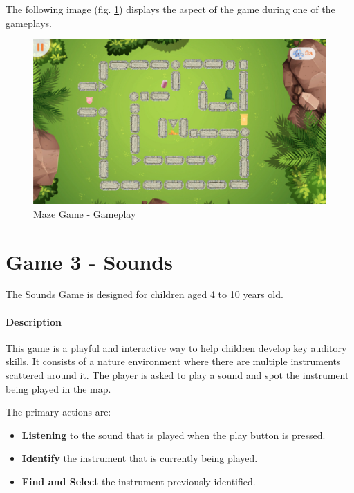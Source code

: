 The following image (fig. \ref{fig:mazeGameplay}) displays the aspect of the game during one of the gameplays.

\begin{figure}[H]
    \centering
    \includegraphics[scale=0.45]{Chapters/gameplay/MazeGame.jpg}
    \caption{Maze Game - Gameplay}
    \label{fig:mazeGameplay}    
\end{figure}

\newpage
\section{Game 3 - Sounds}

The Sounds Game is designed for children aged 4 to 10 years old.

\paragraph{Description}
This game is a playful and interactive way to help children develop key auditory skills. It consists of a nature environment where there are multiple instruments scattered around it. The player is asked to play a sound and spot the instrument being played in the map.

The primary actions are:

\begin{itemize}
    \item \textbf{Listening} to the sound that is played when the play button is pressed.
    \item \textbf{Identify} the instrument that is currently being played.
    \item \textbf{Find and Select} the instrument previously identified. 
\end{itemize}


